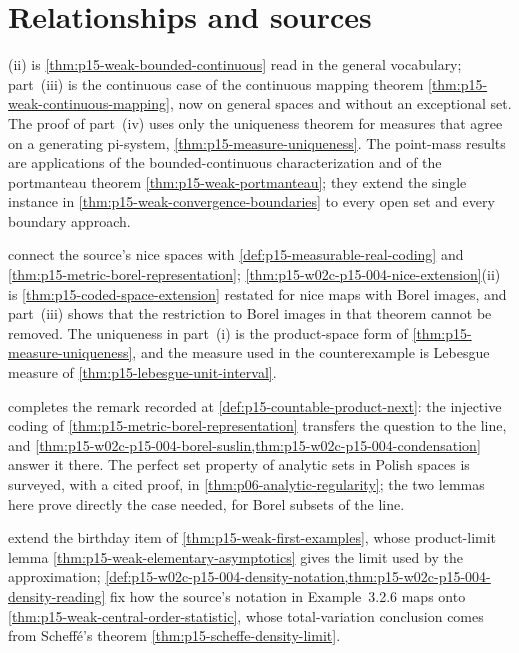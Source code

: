 \section{Relationships and sources}
\label{sec:p15-w02c-p15-004-relations}

(ii) is
\cref{thm:p15-weak-bounded-continuous} read in the general vocabulary;
part~(iii) is the continuous case of the continuous mapping theorem
\cref{thm:p15-weak-continuous-mapping}, now on general spaces and without
an exceptional set. The proof of part~(iv) uses only the uniqueness
theorem for measures that agree on a generating pi-system,
\cref{thm:p15-measure-uniqueness}. The point-mass results are applications
of the bounded-continuous characterization and of the portmanteau
theorem \cref{thm:p15-weak-portmanteau}; they extend the single instance
in \cref{thm:p15-weak-convergence-boundaries} to every open set and every
boundary approach.

connect the source's nice spaces with \cref{def:p15-measurable-real-coding}
and \cref{thm:p15-metric-borel-representation};
\cref{thm:p15-w02c-p15-004-nice-extension}(ii) is
\cref{thm:p15-coded-space-extension} restated for nice maps with Borel
images, and part~(iii) shows that the restriction to Borel images in that
theorem cannot be removed. The uniqueness in part~(i) is the product-space
form of \cref{thm:p15-measure-uniqueness}, and the measure used in the
counterexample is Lebesgue measure of \cref{thm:p15-lebesgue-unit-interval}.

 completes the remark
recorded at \cref{def:p15-countable-product-next}: the injective coding
of \cref{thm:p15-metric-borel-representation} transfers the question to
the line, and \cref{thm:p15-w02c-p15-004-borel-suslin,thm:p15-w02c-p15-004-condensation}
answer it there. The perfect set property of analytic sets in Polish
spaces is surveyed, with a cited proof, in
\cref{thm:p06-analytic-regularity}; the two lemmas here prove directly
the case needed, for Borel subsets of the line.

extend the birthday item of \cref{thm:p15-weak-first-examples}, whose
product-limit lemma \cref{thm:p15-weak-elementary-asymptotics} gives the
limit used by the approximation;
\cref{def:p15-w02c-p15-004-density-notation,thm:p15-w02c-p15-004-density-reading}
fix how the source's notation in Example~3.2.6 maps onto
\cref{thm:p15-weak-central-order-statistic}, whose total-variation
conclusion comes from Scheff\'e's theorem
\cref{thm:p15-scheffe-density-limit}.

